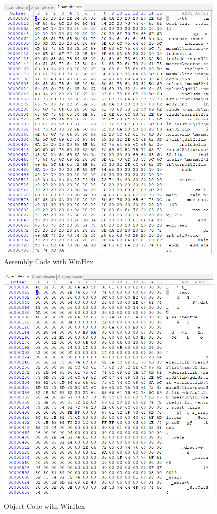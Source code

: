 \documentclass[11pt]{article}
\begin{document}
\begin{figure}[h!]
        \centering
        \includegraphics[width=17cm]{WinHexAsm.png}
        \caption{Assembly Code with WinHex}
        \label{fig:WinHexAsm}
\end{figure}

\begin{figure}[h!]
        \centering
        \includegraphics[width=17cm]{WinHexObj.png}
        \caption{Object Code with WinHex}
        \label{fig:WinHexObj}
\end{figure}
\end{document}
